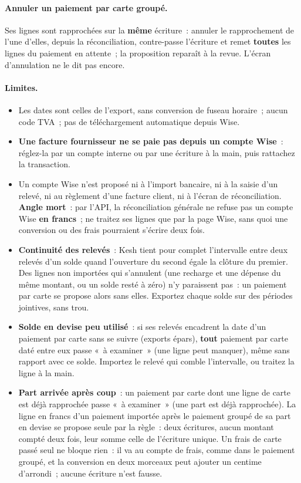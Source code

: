 \documentclass[a4paper,11pt,oneside]{article}
\begin{document}
\paragraph{Annuler un paiement par carte groupé.} Ses lignes sont rapprochées sur la \textbf{même} écriture~: annuler le rapprochement de l'une d'elles, depuis la réconciliation, contre-passe l'écriture et remet \textbf{toutes} les lignes du paiement en attente~; la proposition reparaît à la revue. L'écran d'annulation ne le dit pas encore.

\paragraph{Limites.}
\begin{itemize}
    \item Les dates sont celles de l'export, sans conversion de fuseau horaire~; aucun code TVA~; pas de téléchargement automatique depuis Wise.
    \item \textbf{Une facture fournisseur ne se paie pas depuis un compte Wise}~: réglez-la par un compte interne ou par une écriture à la main, puis rattachez la transaction.
    \item Un compte Wise n'est proposé ni à l'import bancaire, ni à la saisie d'un relevé, ni au règlement d'une facture client, ni à l'écran de réconciliation. \textbf{Angle mort}~: par l'API, la réconciliation générale ne refuse pas un compte Wise \textbf{en francs}~; ne traitez ses lignes que par la page Wise, sans quoi une conversion ou des frais pourraient s'écrire deux fois.
    \item \textbf{Continuité des relevés}~: Kesh tient pour complet l'intervalle entre deux relevés d'un solde quand l'ouverture du second égale la clôture du premier. Des lignes non importées qui s'annulent (une recharge et une dépense du même montant, ou un solde resté à zéro) n'y paraissent pas~: un paiement par carte se propose alors sans elles. Exportez chaque solde sur des périodes jointives, sans trou.
    \item \textbf{Solde en devise peu utilisé}~: si ses relevés encadrent la date d'un paiement par carte sans se suivre (exports épars), \textbf{tout} paiement par carte daté entre eux passe «~à examiner~» (une ligne peut manquer), même sans rapport avec ce solde. Importez le relevé qui comble l'intervalle, ou traitez la ligne à la main.
    \item \textbf{Part arrivée après coup}~: un paiement par carte dont une ligne de carte est déjà rapprochée passe «~à examiner~» (une part est déjà rapprochée). La ligne en francs d'un paiement importée après le paiement groupé de sa part en devise se propose seule par la règle~: deux écritures, aucun montant compté deux fois, leur somme celle de l'écriture unique. Un frais de carte passé seul ne bloque rien~: il va au compte de frais, comme dans le paiement groupé, et la conversion en deux morceaux peut ajouter un centime d'arrondi~; aucune écriture n'est fausse.
\end{itemize}
\end{document}
